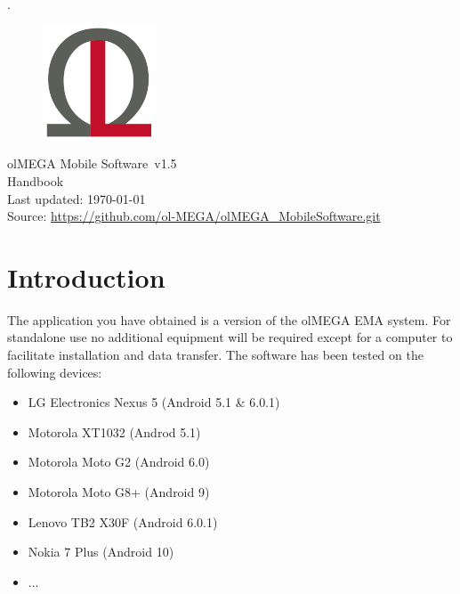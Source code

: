 \documentclass[11pt,a4paper,titlepage]{article}
\newcommand{\titleFull}{olMEGA Mobile Software}
\newcommand{\version}{v1.5}
\begin{document}
 
\pagestyle{empty}

\sffamily
\mdseries


\textcolor[rgb]{1,1,1}{.}
	\vspace{3cm}
	\begin{center}
	
	\begin{figure}[h]
		\centering
			\includegraphics[width=0.30\textwidth]{images/Logo.jpg}
	\end{figure}
	\vspace{3cm}
	\Huge
	\titleFull \ \version
	\normalsize
	\\
	\vspace{1cm}
	Handbook\\
	\vspace{1cm}
	Last updated: \today\\
	\vspace{1cm}
	Source: \url{https://github.com/ol-MEGA/olMEGA_MobileSoftware.git}
	\vfill
	\end{center}

%
\clearpage

\tableofcontents

\clearpage

\setcounter{page}{1}
\pagestyle{fancy}

\section{Introduction}

The application you have obtained is a version of the olMEGA EMA system. For standalone use no additional equipment will be required except for a computer to facilitate installation and data transfer. The software has been tested on the following devices:
\begin{itemize}
	\item LG Electronics Nexus 5 (Android 5.1 \& 6.0.1)
	\item Motorola XT1032 (Androd 5.1)
	\item Motorola Moto G2  (Android 6.0)
	\item Motorola Moto G8+ (Android 9)
	\item Lenovo TB2 X30F (Android 6.0.1)
	\item Nokia 7 Plus (Android 10)
	\item ...
\end{itemize}
\end{document}
